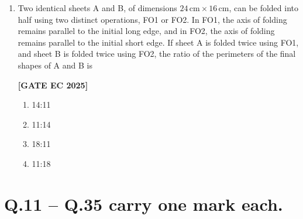 \documentclass[12pt]{article}
\begin{document}
\begin{enumerate}[leftmargin=1.5em, label=\textbf{Q.\arabic*}., itemsep=2em]
\item Two identical sheets A and B, of dimensions $24 \,\text{cm} \times 16 \,\text{cm}$, can be folded into half using two distinct operations, FO1 or FO2.  
In FO1, the axis of folding remains parallel to the initial long edge, and in FO2, the axis of folding remains parallel to the initial short edge.  
If sheet A is folded twice using FO1, and sheet B is folded twice using FO2, the ratio of the perimeters of the final shapes of A and B is

\noindent \textbf{[GATE EC 2025]}
\begin{multicols}{2}
\begin{enumerate}
    \item 14:11
    \item 11:14
    \item 18:11
    \item 11:18
\end{enumerate}
\end{multicols}

\end{enumerate}

\section*{Q.11 -- Q.35 carry one mark each.}
\end{document}
